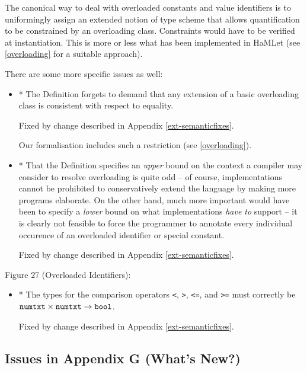 \documentclass[twoside,titlepage]{article}
\begin{document}
\begin{appendix}
The canonical way to deal with overloaded constants and value identifiers is to uniformingly assign an extended notion of type scheme that allows quantification to be constrained by an overloading class. Constraints would have to be verified at instantiation. This is more or less what has been implemented in HaMLet (see \ref{overloading} for a suitable approach).

There are some more specific issues as well:

\begin{itemize}

\item * The Definition forgets to demand that any extension of a basic overloading class is consistent with respect to equality.

Fixed by change described in Appendix \ref{ext-semanticfixes}.

Our formalisation includes such a restriction (see \ref{overloading}).

\item * That the Definition specifies an {\em upper} bound on the context a compiler may consider to resolve overloading is quite odd -- of course, implementations cannot be prohibited to conservatively extend the language by making more programs elaborate. On the other hand, much more important would have been to specify a {\em lower} bound on what implementations {\em have to} support -- it is clearly not feasible to force the programmer to annotate every individual occurence of an overloaded identifier or special constant.

Fixed by change described in Appendix \ref{ext-semanticfixes}.


\end{itemize}

Figure 27 (Overloaded Identifiers):

\begin{itemize}
\item * The types for the comparison operators {\tt<}, {\tt>}, {\tt<=}, and {\tt>=} must correctly be ${\tt numtxt} \times {\tt numtxt} \to {\tt bool}$.

Fixed by change described in Appendix \ref{ext-semanticfixes}.
\end{itemize}



\subsection{Issues in Appendix G (What's New?)}
\label{bugsappendixg}


\end{appendix}
\end{document}
